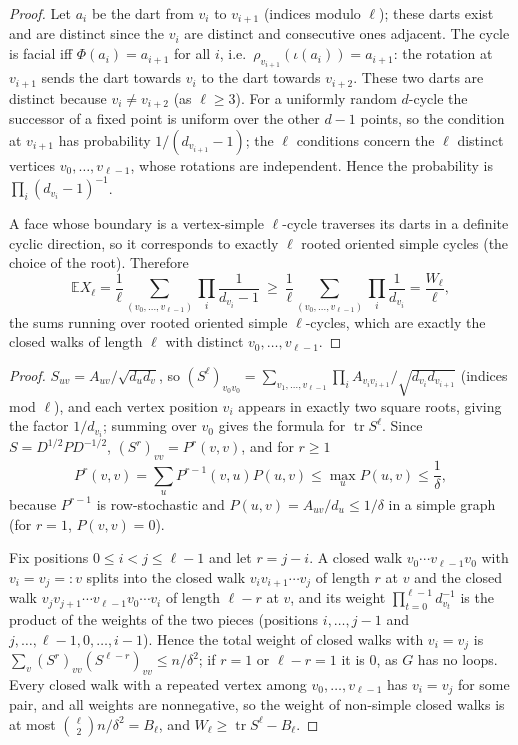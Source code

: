 \documentclass[11pt,a4paper]{article}
\theoremstyle{plain}
\theoremstyle{definition}
\theoremstyle{remark}
\newcommand{\E}{\mathbb E}
\DeclareMathOperator{\tr}{tr}
\begin{document}
\label{pf:cycleprob}
\lemcycleprob*
\begin{proof}
Let $a_i$ be the dart from $v_i$ to $v_{i+1}$ (indices modulo $\ell$); these darts exist and are distinct since the $v_i$ are distinct and consecutive ones adjacent. The cycle is facial iff $\Phi(a_i)=a_{i+1}$ for all $i$, i.e.\ $\rho_{v_{i+1}}(\iota(a_i))=a_{i+1}$: the rotation at $v_{i+1}$ sends the dart towards $v_i$ to the dart towards $v_{i+2}$. These two darts are distinct because $v_i\ne v_{i+2}$ (as $\ell\ge3$). For a uniformly random $d$-cycle the successor of a fixed point is uniform over the other $d-1$ points, so the condition at $v_{i+1}$ has probability $1/(d_{v_{i+1}}-1)$; the $\ell$ conditions concern the $\ell$ distinct vertices $v_0,\dots,v_{\ell-1}$, whose rotations are independent. Hence the probability is $\prod_i(d_{v_i}-1)^{-1}$.

A face whose boundary is a vertex-simple $\ell$-cycle traverses its darts in a definite cyclic direction, so it corresponds to exactly $\ell$ rooted oriented simple cycles (the choice of the root). Therefore
\[
 \E X_\ell=\frac1\ell\sum_{(v_0,\dots,v_{\ell-1})}\prod_i\frac1{d_{v_i}-1}\ \ge\ \frac1\ell\sum_{(v_0,\dots,v_{\ell-1})}\prod_i\frac1{d_{v_i}}=\frac{W_\ell}\ell,
\]
the sums running over rooted oriented simple $\ell$-cycles, which are exactly the closed walks of length $\ell$ with distinct $v_0,\dots,v_{\ell-1}$.
\end{proof}

\label{pf:walks}
\lemwalks*
\begin{proof}
$S_{uv}=A_{uv}/\sqrt{d_ud_v}$, so $(S^\ell)_{v_0v_0}=\sum_{v_1,\dots,v_{\ell-1}}\prod_{i}A_{v_iv_{i+1}}/\sqrt{d_{v_i}d_{v_{i+1}}}$ (indices mod $\ell$), and each vertex position $v_i$ appears in exactly two square roots, giving the factor $1/d_{v_i}$; summing over $v_0$ gives the formula for $\tr S^\ell$. Since $S=D^{1/2}PD^{-1/2}$, $(S^r)_{vv}=P^r(v,v)$, and for $r\ge1$
\[
 P^r(v,v)=\sum_uP^{r-1}(v,u)P(u,v)\le\max_uP(u,v)\le\frac1\delta,
\]
because $P^{r-1}$ is row-stochastic and $P(u,v)=A_{uv}/d_u\le1/\delta$ in a simple graph (for $r=1$, $P(v,v)=0$).

Fix positions $0\le i<j\le\ell-1$ and let $r=j-i$. A closed walk $v_0\cdots v_{\ell-1}v_0$ with $v_i=v_j=:v$ splits into the closed walk $v_iv_{i+1}\cdots v_j$ of length $r$ at $v$ and the closed walk $v_jv_{j+1}\cdots v_{\ell-1}v_0\cdots v_i$ of length $\ell-r$ at $v$, and its weight $\prod_{t=0}^{\ell-1}d_{v_t}^{-1}$ is the product of the weights of the two pieces (positions $i,\dots,j-1$ and $j,\dots,\ell-1,0,\dots,i-1$). Hence the total weight of closed walks with $v_i=v_j$ is $\sum_v(S^r)_{vv}(S^{\ell-r})_{vv}\le n/\delta^2$; if $r=1$ or $\ell-r=1$ it is $0$, as $G$ has no loops. Every closed walk with a repeated vertex among $v_0,\dots,v_{\ell-1}$ has $v_i=v_j$ for some pair, and all weights are nonnegative, so the weight of non-simple closed walks is at most $\binom\ell2n/\delta^2=B_\ell$, and $W_\ell\ge\tr S^\ell-B_\ell$.
\end{proof}
\end{document}
